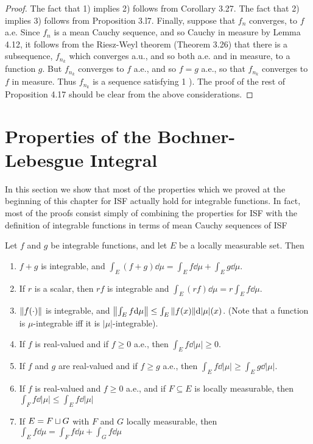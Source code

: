 \begin{proof}
The fact that 1) implies 2) follows from Corollary 3.27. The fact that 2) implies 3) follows from Proposition 3.l7. Finally, suppose that $f_n$ converges, to $f$ a.e. Since $f_n$ is a mean Cauchy sequence, and so Cauchy in measure by Lemma 4.12, it follows from the Riesz-Weyl theorem (Theorem 3.26) that there is a subsequence, $f_{n_k}$ which converges a.u., and so both a.e. and in measure, to a function $g$. But $f_{n_k}$ converges to $f$ a.e., and so $f=g$ a.e., so that $f_{n_k}$ converges to $f$ in measure. Thus $f_{n_k}$ is a sequence satisfying 1 ). The proof of the rest of Proposition 4.17 should be clear from the above considerations.
\end{proof}

\section{Properties of the Bochner-Lebesgue Integral}

In this section we show that most of the properties which we proved at the beginning of this chapter for ISF actually hold for integrable functions. In fact, most of the proofs consist simply of combining the properties for ISF with the definition of integrable functions in terms of mean Cauchy sequences of ISF

\begin{proposition}
Let $f$ and $g$ be integrable functions, and let $E$ be a locally measurable set. Then
\begin{enumerate}
    \item $f+g$ is integrable, and $\int_E(f+g)\dd\mu=\int_Ef\dd\mu+\int_Eg\dd\mu$.

    \item If $r$ is a scalar, then $rf$ is integrable and $\int_E(rf)\dd\mu=r\int_Ef\dd\mu$.

    \item $\norm{f(\cdot)}$ is integrable, and $\norm{\int_Ef\dd\mu}\leq\int_E\norm{f(x)}\dd|\mu|(x)$. (Note that a function is $\mu$-integrable iff it is $|\mu|$-integrable).

    \item If $f$ is real-valued and if $f\geq0$ a.e., then $\int_Ef\dd|\mu|\geq0$.

    \item If $f$ and $g$ are real-valued and if $f\geq g$ a.e., then $\int_Ef\dd|\mu|\geq\int_Eg\dd|\mu|$.

    \item If $f$ is real-valued and $f\geq0$ a.e., and if $F\subseteq E$ is locally measurable, then $\int_Ff\dd|\mu|\leq\int_Ef\dd|\mu|$

    \item If $E=F\sqcup G$ with $F$ and $G$ locally measurable, then $\int_Ef\dd\mu=\int_Ff\dd\mu+\int_Gf\dd\mu$
\end{enumerate}
\end{proposition}

